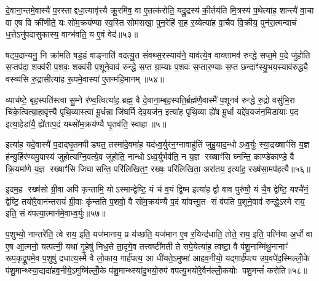 दे॒वाना॒न्तमे॒वास्यै॑ प॒रस्ताद्दधा॒त्यावृ॑त्त्यै क्रू॒रमि॑व॒ वा ए॒तत्क॑रोति॒ यद्रु॒द्रस्य॑ की॒र्तय॑ति मि॒त्रस्य॑ प॒थेत्या॑ह॒ शान्त्यै॑ वा॒चा वा ए॒ष वि क्री॑णीते॒ यः सो॑म॒क्रय॑ण्या स्व॒स्ति सोम॑सखा॒ पुन॒रेहि॑ स॒ह र॒य्येत्या॑ह वा॒चैव वि॒क्रीय॒ पुन॑रा॒त्मन्वाचं॑ ध॒त्तेऽनु॑पदासुकास्य॒ वाग्भ॑वति॒ य ए॒वं वेद॑॥५३॥

{\anuvakamend[{सत॑नुं॒ विष्ण॑व॒ इत्या॑ह स॒मारो॑हति॒ ध्याय॑ति॒ तद्वा॒चा यज॑मानः स्यात्करोति क्रू॒रो वेद॑॥७॥}]}

षट्प॒दान्यनु॒ नि क्रा॑मति षड॒हं वाङ्नाति॑ वदत्यु॒त सं॑वथ्स॒रस्याय॑ने॒ याव॑त्ये॒व वाक्तामव॑ रुन्द्धे सप्त॒मे प॒दे जु॑होति स॒प्तप॑दा॒ शक्व॑री प॒शवः॒ शक्व॑री प॒शूने॒वाव॑ रुन्द्धे स॒प्त ग्रा॒म्याः प॒शवः॑ स॒प्तार॒ण्याः स॒प्त छन्दाꣳ॑स्यु॒भय॒स्याव॑रुद्ध्यै॒ वस्व्य॑सि रु॒द्रासीत्या॑ह रू॒पमे॒वास्या॑ ए॒तन्म॑हि॒मानम्॥५४॥

व्याच॑ष्टे॒ बृह॒स्पति॑स्त्वा सु॒म्ने र॑ण्व॒त्वित्या॑ह॒ ब्रह्म॒ वै दे॒वाना॒म्बृह॒स्पति॒र्ब्रह्म॑णै॒वास्मै॑ प॒शूनव॑ रुन्द्धे रु॒द्रो वसु॑भि॒रा चि॑के॒त्वित्या॒हावृ॑त्त्यै पृथि॒व्यास्त्वा॑ मू॒र्धन्ना जि॑घर्मि देव॒यज॑न॒ इत्या॑ह पृथि॒व्या ह्ये॑ष मू॒र्धा यद्दे॑व॒यज॑न॒मिडा॑याः प॒द इत्या॒हेडा॑यै॒ ह्ये॑तत्प॒दं यथ्सो॑म॒क्रय॑ण्यै घृ॒तव॑ति॒ स्वाहा॥५॥

इत्या॑ह॒ यदे॒वास्यै॑ प॒दाद्घृ॒तमपीड्यत॒ तस्मा॑दे॒वमा॑ह॒ यद॑ध्व॒र्युर॑न॒ग्नावाहु॑तिं जुहु॒याद॒न्धोऽध्व॒र्युः स्या॒द्रख्षाꣳ॑सि य॒ज्ञ ह॑न्यु॒र्\mbox{}हिर॑ण्यमु॒पास्य॑ जुहोत्यग्नि॒वत्ये॒व जु॑होति॒ नान्धोऽध्व॒र्युर्भव॑ति॒ न य॒ज्ञ रख्षाꣳ॑सि घ्नन्ति॒ काण्डे॑काण्डे॒ वै क्रि॒यमा॑णे य॒ज्ञ रख्षाꣳ॑सि जिघासन्ति॒ परि॑लिखित॒ꣳ॒ रख्षः॒ परि॑लिखिता॒ अरा॑तय॒ इत्या॑ह॒ रख्ष॑सा॒मप॑हत्यै॥५६॥

इ॒दम॒ह रख्ष॑सो ग्री॒वा अपि॑ कृन्तामि॒ योऽस्मान्द्वेष्टि॒ यं च॑ व॒यं द्वि॒ष्म इत्या॑ह॒ द्वौ वाव पुरु॑षौ॒ यं चै॒व द्वेष्टि॒ यश्चै॑नं॒ द्वेष्टि॒ तयो॑रे॒वान॑न्तरायं ग्री॒वाः कृ॑न्तति प॒शवो॒ वै सो॑म॒क्रय॑ण्यै प॒दं या॑वत्त्मू॒त सं व॑पति प॒शूने॒वाव॑ रुन्द्धे॒ऽस्मे राय॒ इति॒ सं व॑पत्या॒त्मान॑मे॒वाध्व॒र्युः॥५७॥

प॒शुभ्यो॒ नान्तरे॑ति॒ त्वे राय॒ इति॒ यज॑मानाय॒ प्र य॑च्छति॒ यज॑मान ए॒व र॒यिन्द॑धाति॒ तोते॒ राय॒ इति॒ पत्नि॑या अ॒र्धो वा ए॒ष आ॒त्मनो॒ यत्पत्नी॒ यथा॑ गृ॒हेषु॑ निध॒त्ते ता॒दृगे॒व तत्त्वष्टी॑मती ते सपे॒येत्या॑ह॒ त्वष्टा॒ वै प॑शू॒नाम्मि॑थु॒नानाꣳ॑ रूप॒कृद्रू॒पमे॒व प॒शुषु॑ दधात्य॒स्मै वै लो॒काय॒ गार्\mbox{}ह॑पत्य॒ आ धी॑यते॒ऽमुष्मा॑ आहव॒नीयो॒ यद्गार्\mbox{}ह॑पत्य उप॒वपे॑द॒स्मिल्लोँ॒के प॑शु॒मान्थ्स्या॒द्यदा॑हव॒नीये॒ऽमुष्मि॑ल्लोँ॒के प॑शु॒मान्थ्स्या॑दु॒भयो॒रुप॑ वपत्यु॒भयो॑रे॒वैन॑ल्लोँ॒कयोः पशु॒मन्तं॑ करोति॥५८॥

